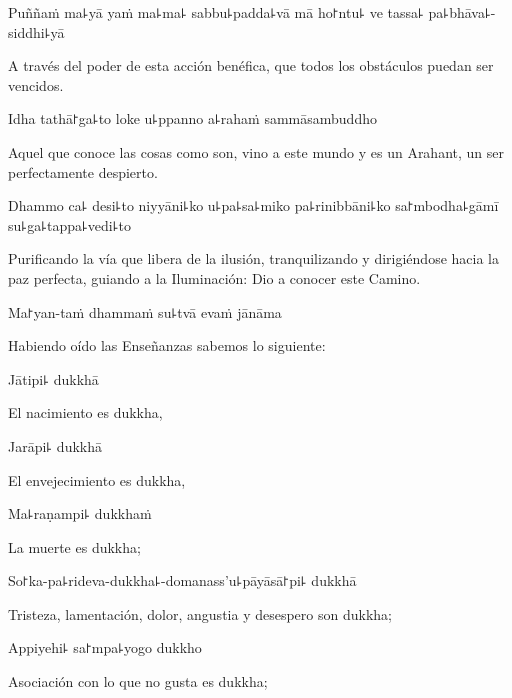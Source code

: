 Puññaṁ ma꜕yā yaṁ ma꜕ma꜕ sabbu꜕padda꜕vā mā ho꜓ntu꜕ ve tassa꜕ pa꜕bhāva꜕-siddhi꜕yā

\begin{english}
  A través del poder de esta acción benéfica, que todos los obstáculos puedan ser vencidos.
\end{english}

Idha tathā꜓ga꜕to loke u꜕ppanno a꜕rahaṁ sammāsambuddho

\begin{english}
  Aquel que conoce las cosas como son, vino a este mundo y es un Arahant, un ser perfectamente despierto.
\end{english}

Dhammo ca꜕ desi꜕to niyyāni꜕ko u꜕pa꜕sa꜕miko pa꜕rinibbāni꜕ko sa꜓mbodha꜕gāmī su꜕ga꜕tappa꜕vedi꜕to

\enlargethispage{\baselineskip}

\begin{english}
  Purificando la vía que libera de la ilusión, tranquilizando y dirigiéndose hacia la paz perfecta, guiando a la Iluminación: Dio a conocer este Camino.
\end{english}

Ma꜓yan-taṁ dhammaṁ su꜕tvā evaṁ jānāma

\begin{english}
  Habiendo oído las Enseñanzas sabemos lo siguiente:
\end{english}

Jātipi꜕ dukkhā

\begin{english}
  El nacimiento es dukkha,
\end{english}

Jarāpi꜕ dukkhā

\begin{english}
  El envejecimiento es dukkha,
\end{english}

Ma꜕raṇampi꜕ dukkhaṁ

\begin{english}
  La muerte es dukkha;
\end{english}

So꜓ka-pa꜕rideva-dukkha꜕-domanass'u꜕pāyāsā꜓pi꜕ dukkhā

\begin{english}
  Tristeza, lamentación, dolor, angustia y desespero son dukkha;
\end{english}

Appiyehi꜕ sa꜓mpa꜕yogo dukkho

\begin{english}
  Asociación con lo que no gusta es dukkha;
\end{english}

